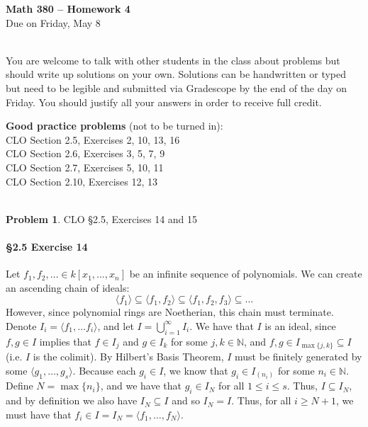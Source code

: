 \documentclass[12pt]{amsart}
\theoremstyle{definition}
\newtheorem{prob}{Problem}
\begin{document}
 \thispagestyle{empty}
\begin{center} {\large \textbf{Math 380 -- Homework  4}} \smallskip \\ 
Due on Friday, May 8\ \\ \ \\
 \end{center}

You are welcome to talk with other students in the class about problems but should write up solutions on your own. 
Solutions can be handwritten or typed but need to be legible and submitted via Gradescope by the end of the day 
on Friday. You should justify all your answers in order to receive full credit.  
\bigskip 

\begin{flushleft}

{\bf Good practice problems} (not to be turned in): \\

CLO Section 2.5, Exercises 2, 10, 13,  16\\
CLO Section 2.6, Exercises 3, 5, 7, 9\\
CLO Section 2.7, Exercises 5, 10, 11\\
CLO Section 2.10, Exercises 12, 13\\ \ \\
\bigskip 




\begin{prob} CLO \S2.5, Exercises 14 and 15\\
\end{prob}
\bigskip 
\paragraph{\S2.5 Exercise 14} Let $f_1,f_2,\dots \in k[x_1,\dots,x_n]$ be an infinite sequence of polynomials. We can create an ascending chain of ideals:
\[\langle f_1\rangle \subseteq \langle f_1,f_2\rangle \subseteq \langle f_1,f_2,f_3\rangle \subseteq \dots \]
However, since polynomial rings are Noetherian, this chain must terminate. Denote $I_i = \langle f_1,\dots f_i\rangle$, and let $I = \bigcup_{i=1}^\infty I_i$. We have that $I$ is an ideal, since $f, g\in I$ implies that $f \in I_j$ and $g \in I_k$ for some $j,k \in \mathbb N$, and $f,g\in I_{\max\{j,k\}}\subseteq I$ (i.e. $I$ is the colimit). By Hilbert's Basis Theorem, $I$ must be finitely generated by some $\langle g_1,\dots, g_s \rangle$. Because each $g_i \in I$, we know that $g_i \in I_{(n_i)}$ for some $n_i \in \mathbb N$. Define $N = \max \{ n_i\}$, and we have that $g_i \in I_{N}$ for all $1 \le i \le s$. Thus, $I \subseteq I_N$, and by definition we also have $I_N \subseteq I$ and so $I_N = I$. Thus, for all $i \ge N+1$, we must have that $f_i \in I=I_N = \langle f_1,\dots, f_N\rangle$.


\end{flushleft}
\end{document}
